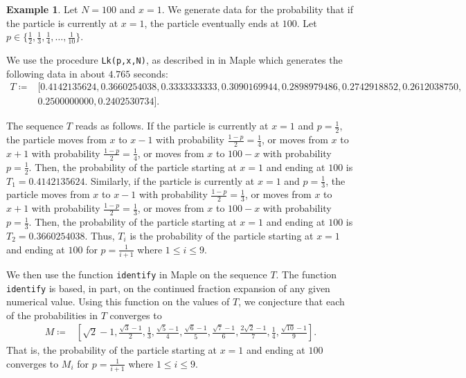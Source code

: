 \documentclass[reqno]{amsart}
\theoremstyle{definition}
\newtheorem{example}{Example}
\theoremstyle{definition}
\theoremstyle{remark}
\begin{document}
\begin{example}\label{ex: x=1 prob in intro}
Let $N=100$ and $x=1$. We generate data for the probability that if the particle is currently at $x=1$, the particle eventually ends at $100$. Let $p\in \{\frac{1}{2},\frac{1}{3},\frac{1}{4},\ldots, \frac{1}{10}\}$. 


We use the procedure \texttt{Lk(p,x,N)}, as described in  in Maple which generates the following data in about $4.765$ seconds:
\begin{align*}
    T \coloneqq &[0.4142135624, 0.3660254038, 0.3333333333, 0.3090169944, 0.2898979486, 0.2742918852, 0.2612038750, \\
    &0.2500000000,0.2402530734].
\end{align*}

\noindent The sequence $T$ reads as follows. If the particle is currently at $x=1$ and $p=\frac{1}{2}$, the particle moves from $x$ to $x-1$ with probability $\frac{1-p}{2}=\frac{1}{4}$, or moves from $x$ to $x+1$ with probability $\frac{1-p}{2}=\frac{1}{4}$, or moves from $x$ to $100-x$ with probability $p=\frac{1}{2}$. Then, the probability of the particle starting at $x=1$ and ending at $100$ is $T_1=0.4142135624$. Similarly, if the particle is currently at $x=1$ and $p=\frac{1}{3}$, the particle moves from $x$ to $x-1$ with probability $\frac{1-p}{2}=\frac{1}{3}$, or moves from $x$ to $x+1$ with probability $\frac{1-p}{2}=\frac{1}{3}$, or moves from $x$ to $100-x$ with probability $p=\frac{1}{3}$. Then, the probability of the particle starting at $x=1$ and ending at $100$ is $T_2=0.3660254038$. Thus, $T_i$ is the probability of the particle starting at $x=1$ and ending at $100$ for $p=\frac{1}{i+1}$ where $1\leq i\leq 9$.


We then use the function 
\texttt{identify} in Maple on the sequence $T$. The function \texttt{identify} is based, in part, on the continued fraction expansion of any given numerical value. Using this function on the values of $T$, we conjecture that each of the probabilities in $T$ converges to
\begin{align*}
    M\coloneqq&\left[\sqrt{2}-1, \frac{\sqrt{3}-1}{2}, \frac{1}{3}, \frac{\sqrt{5}-1}{4}, \frac{\sqrt{6}-1}{5}, \frac{\sqrt{7}-1}{6},\frac{2 \sqrt{2}-1}{7}, \frac{1}{4}, \frac{\sqrt{10}-1}{9} \right].
\end{align*}
That is, the probability of the particle starting at $x=1$ and ending at $100$ converges to $M_i$ for $p=\frac{1}{i+1}$ where $1\leq i\leq 9$.
\end{example}
\end{document}
